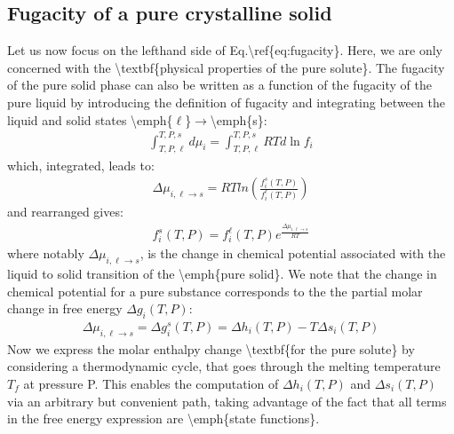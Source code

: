 \documentclass[letterpaper,10pt,english]{jupyterBook}
\begin{document}
\subsection{Fugacity of a pure crystalline solid}
\label{\detokenize{Solubility:fugacity-of-a-pure-crystalline-solid}}
\sphinxAtStartPar
Let us now focus on the left\sphinxhyphen{}hand side of Eq.\textbackslash{}ref\{eq:fugacity\}. Here, we are only concerned with the \textbackslash{}textbf\{physical properties of the pure solute\}.
The fugacity of the pure solid phase can also be written as a function of the fugacity of the pure liquid by introducing the definition of fugacity and integrating between the liquid and solid states \textbackslash{}emph\{\(\ell\)\}\(\rightarrow\)\textbackslash{}emph\{s\}:
\begin{equation*}
\begin{split}
\int^{T,P,s}_{T,P,\ell}d\mu_i=\int^{T,P,s}_{T,P,\ell}RTd\ln{f_i}
\end{split}
\end{equation*}
\sphinxAtStartPar
which, integrated, leads to:
\begin{equation*}
\begin{split}
\Delta{\mu}_{i,\ell\rightarrow{s}}=RTln\left(\frac{f_i^s(T,P)}{f_i^\ell(T,P)}\right)
\end{split}
\end{equation*}
\sphinxAtStartPar
and rearranged gives:
\begin{equation*}
\begin{split}
f_i^s(T,P)=f_i^\ell(T,P)e^{\frac{\Delta{\mu}_{i,\ell\rightarrow{s}}}{RT}}
\end{split}
\end{equation*}
\sphinxAtStartPar
where notably \(\Delta{\mu}_{i,\ell\rightarrow{s}}\), is the change in chemical potential associated with the liquid to solid transition of the \textbackslash{}emph\{pure solid\}.
We note that the change in chemical potential for a pure substance corresponds to the the partial molar change in free energy \(\Delta{g_i(T,P)}\):
\begin{equation*}
\begin{split}
\Delta\mu_{i,\ell\rightarrow{s}}=\Delta{g}_i^s(T,P)=\Delta{h}_i(T,P)-T\Delta{s}_i(T,P)
\end{split}
\end{equation*}
\sphinxAtStartPar
Now we express the molar enthalpy change \textbackslash{}textbf\{for the pure solute\} by considering a thermodynamic cycle, that goes through the melting temperature \(T_f\) at pressure P. This enables the computation of \(\Delta{h}_i(T,P)\) and \(\Delta{s}_i(T,P)\) via an arbitrary but convenient path, taking advantage of the fact that all terms in the free energy expression are \textbackslash{}emph\{state functions\}.
\end{document}
